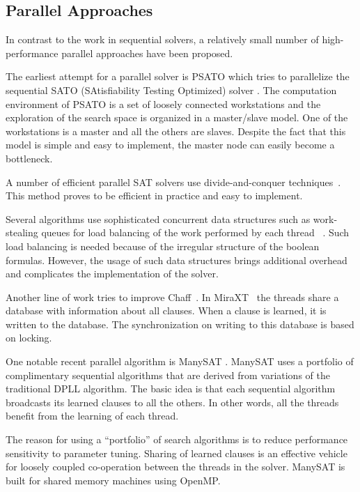 \documentclass[letterpaper, compsoc, conference]{IEEEtran}
\begin{document}
\subsection{Parallel Approaches}
In contrast to the work in sequential solvers, a relatively small number of 
high-performance parallel approaches have been proposed.

\indent The earliest attempt for a parallel solver is PSATO \cite{PSATO} which tries
to parallelize the sequential SATO (SAtisfiability Testing Optimized) solver
\cite{Zhang94sato}. The computation environment of PSATO is a set of loosely connected 
workstations and the exploration of the search space is organized in a master/slave 
model. One of the workstations is a master and all the others are slaves. Despite 
the fact that this model is simple and easy to implement, the master node can easily 
become a bottleneck.

\indent A number of efficient parallel SAT solvers use divide-and-conquer 
techniques~\cite{PMiniSat, Bohm96, Lewis2007MiraXT, Gil08Pmsat}. This method
proves to be efficient in practice and easy to implement. 

\indent Several algorithms use sophisticated concurrent data structures such
as work-stealing queues for load balancing of the work performed by each thread
~\cite{Jurkowiak2005,PMiniSat}. Such load balancing is needed because of the 
irregular structure of the boolean formulas. However, the usage of such data 
structures brings additional overhead and complicates the implementation of the
solver.

\indent Another line of work tries to improve Chaff~\cite{Chrabakh03gradsat, 
Lewis2007MiraXT}. In MiraXT~\cite{Lewis2007MiraXT} the threads share a database with 
information about all clauses. When a clause is learned, it is written to the
database. The synchronization on writing to this database is based on locking.

\indent One notable recent parallel algorithm is ManySAT \citep{ManySAT}.
ManySAT uses a portfolio of complimentary sequential algorithms that are
derived from variations of the traditional DPLL algorithm. The basic idea is
that each sequential algorithm broadcasts its learned clauses to all the
others. In other words, all the threads benefit from the learning of each
thread. 

The reason for using a ``portfolio'' of search algorithms is to reduce
performance sensitivity to parameter tuning. Sharing of learned clauses is an
effective vehicle for loosely coupled co-operation between the threads in the
solver. ManySAT is built for shared memory machines using OpenMP.
\end{document}
